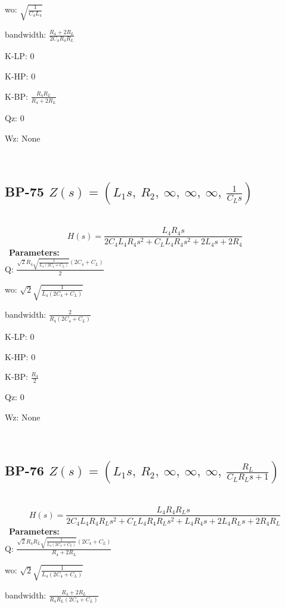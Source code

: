 \documentclass{article}
\begin{document}
wo: $\sqrt{\frac{1}{C_{4} L_{4}}}$\ 

bandwidth: $\frac{R_{4} + 2 R_{L}}{2 C_{4} R_{4} R_{L}}$\ 

K-LP: $0$\ 

K-HP: $0$\ 

K-BP: $\frac{R_{4} R_{L}}{R_{4} + 2 R_{L}}$\ 

Qz: $0$\ 

Wz: $\text{None}$\ 

\ 

\subsection{BP-75 $Z(s) = \left( L_{1} s, \  R_{2}, \  \infty, \  \infty, \  \infty, \  \frac{1}{C_{L} s}\right)$ } \ 
\textbf{\[H(s) = \frac{L_{4} R_{4} s}{2 C_{4} L_{4} R_{4} s^{2} + C_{L} L_{4} R_{4} s^{2} + 2 L_{4} s + 2 R_{4}}\] } \ 
\textbf{Parameters:}\\ 

Q: $\frac{\sqrt{2} R_{4} \sqrt{\frac{1}{L_{4} \left(2 C_{4} + C_{L}\right)}} \left(2 C_{4} + C_{L}\right)}{2}$\ 

wo: $\sqrt{2} \sqrt{\frac{1}{L_{4} \left(2 C_{4} + C_{L}\right)}}$\ 

bandwidth: $\frac{2}{R_{4} \left(2 C_{4} + C_{L}\right)}$\ 

K-LP: $0$\ 

K-HP: $0$\ 

K-BP: $\frac{R_{4}}{2}$\ 

Qz: $0$\ 

Wz: $\text{None}$\ 

\ 

\subsection{BP-76 $Z(s) = \left( L_{1} s, \  R_{2}, \  \infty, \  \infty, \  \infty, \  \frac{R_{L}}{C_{L} R_{L} s + 1}\right)$ } \ 
\textbf{\[H(s) = \frac{L_{4} R_{4} R_{L} s}{2 C_{4} L_{4} R_{4} R_{L} s^{2} + C_{L} L_{4} R_{4} R_{L} s^{2} + L_{4} R_{4} s + 2 L_{4} R_{L} s + 2 R_{4} R_{L}}\] } \ 
\textbf{Parameters:}\\ 

Q: $\frac{\sqrt{2} R_{4} R_{L} \sqrt{\frac{1}{L_{4} \left(2 C_{4} + C_{L}\right)}} \left(2 C_{4} + C_{L}\right)}{R_{4} + 2 R_{L}}$\ 

wo: $\sqrt{2} \sqrt{\frac{1}{L_{4} \left(2 C_{4} + C_{L}\right)}}$\ 

bandwidth: $\frac{R_{4} + 2 R_{L}}{R_{4} R_{L} \left(2 C_{4} + C_{L}\right)}$\ 
\end{document}
